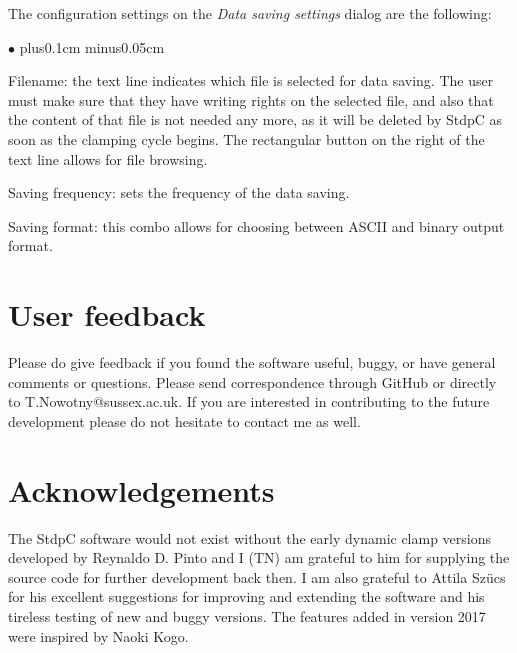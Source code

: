 \documentclass{article}
\newenvironment{myitem}{\begin{list}{$\bullet$}{\setlength{\leftmargin}{1.1em}
\itemsep0.1cm plus0.1cm minus0.05cm
\listparindent0cm
\addtolength{\labelsep}{0.5\labelsep}
\setlength{\labelwidth}{0.8em}
\setlength{\leftmargin}{\labelwidth}
\addtolength{\leftmargin}{\labelsep}
}}{\end{list}}
\begin{document}
The configuration settings on the \emph{Data saving settings} dialog are
the following:
\begin{myitem}
\item Filename: the text line indicates which file is selected for data
  saving. The user must make sure that they have writing rights on the
  selected file, and also that the content of that file is not needed any
  more, as it will be deleted by StdpC as soon as the clamping cycle
  begins. The rectangular button on the right of the text line allows for
  file browsing.
\item Saving frequency: sets the frequency of the data saving.
\item Saving format: this combo allows for choosing between ASCII and
  binary output format.
\end{myitem}


\section{User feedback} 
Please do give feedback if you found the software useful, buggy, or
have general comments or questions. Please send correspondence through
GitHub or directly to T.Nowotny@sussex.ac.uk.
If you are interested in contributing to the future development please
do not hesitate to contact me as well.  
 
\section{Acknowledgements} 
 
The StdpC software would not exist without the early dynamic clamp
versions developed by Reynaldo D. Pinto and I (TN) am grateful to him for supplying the source code for further
development back then. I am also grateful to Attila Sz\"ucs for his excellent
suggestions for improving and extending the software and his tireless
testing of new and buggy versions. The features added in version 2017 were inspired
by Naoki Kogo.



\end{document}
